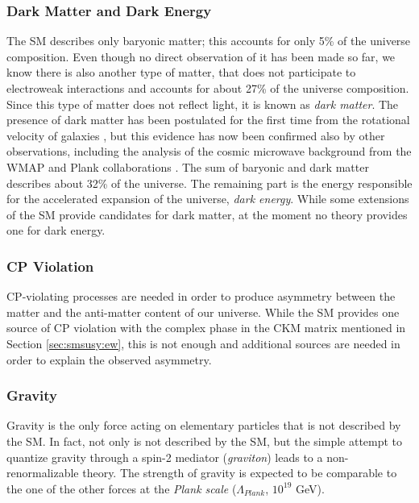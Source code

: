 \subsubsection*{Dark Matter and Dark Energy}

The SM describes only baryonic matter; this accounts for only 5\% of the universe composition. Even though no direct observation of it has been made so far, we know there is also another type of matter, that does not participate to electroweak interactions and  accounts for about 27\% of the universe composition.  Since this type of matter does not reflect light, it is known as \textit{dark matter}. The presence of dark matter has been postulated for the first time from the rotational velocity of galaxies \cite{Zwicky:1937zza}, but this evidence has now been confirmed also by other observations, including the analysis of the cosmic microwave background from the WMAP and Plank collaborations \cite{Larson:2010gs} \cite{Ade:2013zuv}. The sum of baryonic and dark matter describes about 32\% of the universe. The remaining part is the energy responsible for the accelerated expansion of the universe, \textit{dark energy}. While some extensions of the SM provide candidates for dark matter, at the moment no theory provides one for dark energy.


\subsubsection*{CP Violation}

CP-violating processes are needed in order to produce asymmetry between the matter and the anti-matter content of our universe. While the SM provides one source of CP violation with the complex phase in the CKM matrix mentioned in Section \ref{sec:smsusy:ew}, this is not enough and additional sources are needed in order to explain the observed asymmetry.

\subsubsection*{Gravity}

Gravity is the only force acting on elementary particles that is not described by the SM. In fact, not only is not described by the SM, but the simple attempt to quantize gravity through a spin-2  mediator (\textit{graviton}) leads to a non-renormalizable theory. The strength of gravity is expected to be comparable to the one of the other forces at the \textit{Plank scale} ($\Lambda_{Plank}$, $10^{19}$ GeV). 

